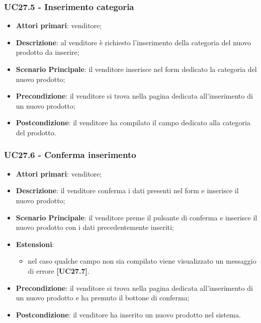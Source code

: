 \subsubsection{UC27.5 - Inserimento categoria}
\begin{itemize}
\item \textbf{Attori primari}: venditore;
\item \textbf{Descrizione}: al venditore è richiesto l'inserimento della categoria del nuovo prodotto da inserire;
\item \textbf{Scenario Principale}: il venditore inserisce nel form dedicato la categoria del nuovo prodotto;
\item \textbf{Precondizione}: il venditore si trova nella pagina dedicata all'inserimento di un nuovo prodotto;
\item \textbf{Postcondizione}: il venditore ha compilato il campo dedicato alla categoria del prodotto.
\end{itemize}

\subsubsection{UC27.6 - Conferma inserimento}
\begin{itemize}
\item \textbf{Attori primari}: venditore;
\item \textbf{Descrizione}: il venditore conferma i dati presenti nel form e inserisce il nuovo prodotto;
\item \textbf{Scenario Principale}: il venditore preme il pulsante di conferma e inserisce il nuovo prodotto con i dati precedentemente inseriti;
\item \textbf{Estensioni}: 
\begin{itemize}
\item nel caso qualche campo non sia compilato viene visualizzato un messaggio di errore \textbf{[UC27.7]}.
\end{itemize} 
\item \textbf{Precondizione}: il venditore si trova nella pagina dedicata all'inserimento di un nuovo prodotto e ha premuto il bottone di conferma;
\item \textbf{Postcondizione}: il venditore ha inserito un nuovo prodotto nel sistema.
\end{itemize}

